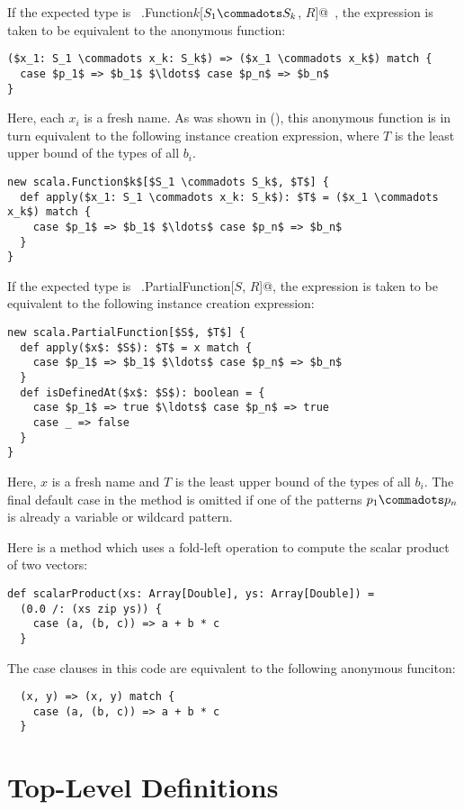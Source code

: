 If the expected type is ~\lstinline@scala.Function$k$[$S_1 \commadots S_k$, $R$]@~,
the expression is taken to be equivalent to the anonymous function:
\begin{lstlisting}
($x_1: S_1 \commadots x_k: S_k$) => ($x_1 \commadots x_k$) match { 
  case $p_1$ => $b_1$ $\ldots$ case $p_n$ => $b_n$ 
}
\end{lstlisting}
Here, each $x_i$ is a fresh name.
As was shown in (), this anonymous function is in turn
equivalent to the following instance creation expression, where
 $T$ is the least upper bound of the types of all $b_i$.
\begin{lstlisting}
new scala.Function$k$[$S_1 \commadots S_k$, $T$] {
  def apply($x_1: S_1 \commadots x_k: S_k$): $T$ = ($x_1 \commadots x_k$) match {
    case $p_1$ => $b_1$ $\ldots$ case $p_n$ => $b_n$
  }
}
\end{lstlisting}
If the expected type is ~\lstinline@scala.PartialFunction[$S$, $R$]@,
the expression is taken to be equivalent to the following instance creation expression:
\begin{lstlisting}
new scala.PartialFunction[$S$, $T$] {
  def apply($x$: $S$): $T$ = x match {
    case $p_1$ => $b_1$ $\ldots$ case $p_n$ => $b_n$
  }
  def isDefinedAt($x$: $S$): boolean = {
    case $p_1$ => true $\ldots$ case $p_n$ => true
    case _ => false
  }
}
\end{lstlisting}
Here, $x$ is a fresh name and $T$ is the least upper bound of the
types of all $b_i$. The final default case in the 
method is omitted if one of the patterns $p_1 \commadots p_n$ is
already a variable or wildcard pattern.

\example Here is a method which uses a fold-left operation
\code{/:} to compute the scalar product of 
two vectors:
\begin{lstlisting}
def scalarProduct(xs: Array[Double], ys: Array[Double]) = 
  (0.0 /: (xs zip ys)) {
    case (a, (b, c)) => a + b * c
  }
\end{lstlisting}
The case clauses in this code are equivalent to the following
anonymous funciton:
\begin{lstlisting}
  (x, y) => (x, y) match {
    case (a, (b, c)) => a + b * c
  }
\end{lstlisting}

\chapter{Top-Level Definitions}
\label{sec:topdefs}

